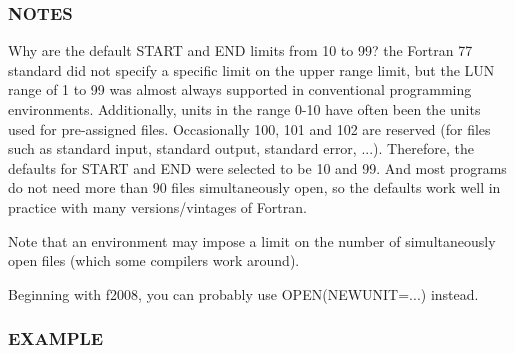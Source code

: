 \subsubsection*{N\+O\+T\+ES}

\begin{DoxyVerb}Why are the default START and END limits from 10 to 99? the Fortran 77
standard did not specify a specific limit on the upper range limit, but
the LUN range of 1 to 99 was almost always supported in conventional
programming environments. Additionally, units in the range 0-10 have
often been the units used for pre-assigned files. Occasionally 100,
101 and 102 are reserved (for files such as standard input, standard
output, standard error, ...). Therefore, the defaults for START and
END were selected to be 10 and 99. And most programs do not need
more than 90 files simultaneously open, so the defaults work well in
practice with many versions/vintages of Fortran.

Note that an environment may impose a limit on the number of
simultaneously open files (which some compilers work around).

Beginning with f2008, you can probably use OPEN(NEWUNIT=...) instead.
\end{DoxyVerb}


\subsubsection*{E\+X\+A\+M\+P\+LE}


